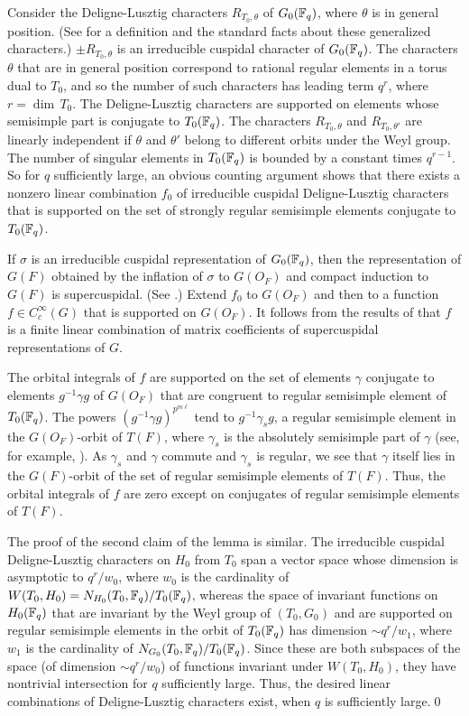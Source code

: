   Consider the Deligne-Lusztig characters
$R_{T_0,\theta}$ of $G_0({\Bbb F}_q)$, where $\theta$ is in general
position. (See \cite{C} for a definition and the standard
facts about these generalized characters.)
 $\pm R_{T_0,\theta}$ is an irreducible cuspidal
character of $G_0({\Bbb F}_q)$.  
 The characters $\theta$ that are
in general position correspond to 
rational regular elements in
a torus dual to $T_0$, and so the number of such characters
has leading term $q^r$, where $r=\dim\,T_0$.  The Deligne-Lusztig
characters are supported on elements whose semisimple part is conjugate
to $T_0({\Bbb F}_q)$.  The characters $R_{T_0,\theta}$ and
$R_{T_0,\theta'}$ are linearly independent if $\theta$ and $\theta'$
belong to different orbits under the Weyl group.
The number of singular
elements in $T_0({\Bbb F}_q)$ is bounded by a constant times $q^{r-1}$.
So for $q$ sufficiently large, an obvious counting argument
shows that there exists a  nonzero linear
combination $f_0$ of irreducible cuspidal
Deligne-Lusztig characters that is supported on the set of
strongly regular semisimple elements conjugate to $T_0({\Bbb F}_q)$.

If $\sigma$ is an irreducible cuspidal representation of $G_0({\Bbb F}_q)$,
then the representation of $G(F)$ obtained by the inflation of $\sigma$
to $G(O_F)$ and compact induction to $G(F)$ is supercuspidal.
(See \cite{G,5.2}.)  Extend $f_0$ to $G(O_F)$ and then 
to a function $f\in C_c^\infty(G)$
that is supported on $G(O_F)$.  It follows from the results of
\cite{G,5.2} that $f$ is a finite linear combination of matrix coefficients
of supercuspidal representations of $G$.

The orbital integrals of $f$ are supported on the set of elements 
$\gamma$ conjugate
to elements $g^{-1}\gamma g$
of $G(O_F)$ that are congruent to regular semisimple
element of $T_0({\Bbb F}_q)$. The powers $(g^{-1}\gamma g)^{p^{m\ell}}$ tend
to $g^{-1}\gamma_s g$, a regular
semisimple element in the $G(O_F)$-orbit of
$T(F)$, where
$\gamma_s$ is the absolutely semisimple part of $\gamma$
(see, for example, \cite{H2,3}).  As $\gamma_s$
and $\gamma$ commute and $\gamma_s$ is regular, we see that $\gamma$
itself lies in the $G(F)$-orbit of the set of regular semisimple
elements of $T(F)$.  Thus, the orbital integrals of $f$ are zero except
on conjugates of regular semisimple elements of $T(F)$.

The proof of the second claim of the lemma is similar.  The
irreducible cuspidal Deligne-Lusztig
characters on $H_0$ from $T_0$ span a vector space whose dimension
is
asymptotic to $q^r/w_0$, where $w_0$ is the cardinality of
$W(T_0,H_0)=N_{H_0}(T_0,{\Bbb F}_q)/T_0({\Bbb F}_q)$, whereas the 
space of invariant functions on $H_0({\Bbb F}_q)$
that are invariant by the Weyl group of $(T_0,G_0)$ and are
supported on regular semisimple elements in the orbit of $T_0({\Bbb F}_q)$
has dimension
$\sim q^r/w_1$, where $w_1$ is the
cardinality of $N_{G_0}(T_0,{\Bbb F}_q)/T_0({\Bbb F}_q)$.  
Since these are both subspaces of the space (of dimension 
$\sim q^r/w_0$) of functions invariant under $W(T_0,H_0)$, they
have nontrivial intersection for $q$ sufficiently large.
Thus, the desired
linear combinations of Deligne-Lusztig characters exist, when
$q$ is sufficiently large.\qed\enddemo

